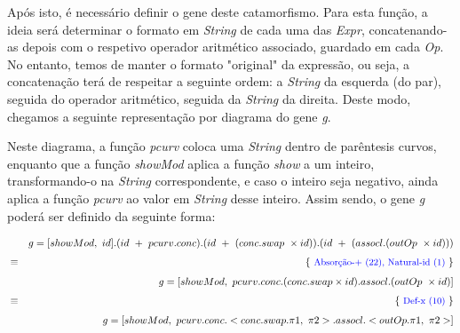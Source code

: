 \documentclass[a4paper]{article}
\begin{document}
\vspace{0.5cm}

Após isto, é necessário definir o gene deste catamorfismo. Para esta função, a ideia será determinar o formato em \textit{String} de cada uma das \textit{Expr}, concatenando-as depois com o respetivo operador aritmético associado, guardado em cada \textit{Op}. No entanto, temos de manter o formato "original" da expressão, ou seja, a concatenação terá de respeitar a seguinte ordem: a \textit{String} da esquerda (do par), seguida do operador aritmético, seguida da \textit{String} da direita. Deste modo, chegamos a seguinte representação por diagrama do gene \textit{g}.

\vspace{0.5cm}

\xymatrixcolsep{2pc}\xymatrixrowsep{2pc}
\centerline{}

\vspace{0.5cm}

Neste diagrama, a função \textit{pcurv} coloca uma \textit{String} dentro de parêntesis curvos, enquanto que a função \textit{showMod} aplica a função \textit{show} a um inteiro, transformando-o na \textit{String} correspondente, e caso o inteiro seja negativo, ainda aplica a função \textit{pcurv} ao valor em \textit{String} desse inteiro. Assim sendo, o gene \textit{g} poderá ser definido da seguinte forma:

\vspace{0.5cm}

\begin{eqnarray*}
\start
  g = [showMod,\ id].(id\ +\ pcurv.conc).(id\ +\ (conc.swap\ \times id)).(id\ +\ (assocl.(outOp\ \times id)))
%
\just\equiv{\textcolor{blue}{Absorção-+ (22), Natural-id (1)}}
%
  g = [showMod,\ pcurv.conc.(conc.swap \times id).assocl.(outOp\ \times id)]
%
\just\equiv{\textcolor{blue}{Def-x (10)}}
%
  g = [showMod,\ pcurv.conc.<conc.swap.\pi1,\ \pi2>.assocl.<outOp.\pi1,\ \pi2>]
%
\end{eqnarray*}
\end{document}
